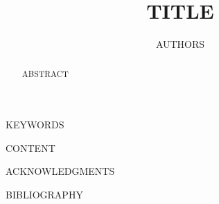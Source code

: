 \documentclass[conference]{IEEEtran}
\begin{document}
\title{{{TITLE}}}

\author{{{AUTHORS}}}

\maketitle

\begin{abstract}
{{ABSTRACT}}
\end{abstract}

\begin{IEEEkeywords}
{{KEYWORDS}}
\end{IEEEkeywords}

{{CONTENT}}

{{ACKNOWLEDGMENTS}}

{{BIBLIOGRAPHY}}
\end{document}
